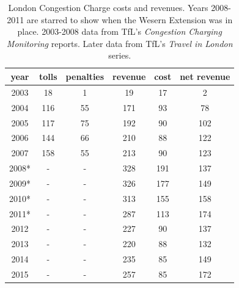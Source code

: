 

\begin{table}[ht]
\begin{tabular}{|c|c|c|c|c|c|}
\hline 
year & tolls & penalties & revenue & cost & net revenue\tabularnewline
\hline 
\hline 
2003 & 18 & 1 & 19 & 17 & 2\tabularnewline
\hline 
2004 & 116 & 55 & 171 & 93 & 78\tabularnewline
\hline 
2005 & 117 & 75 & 192 & 90 & 102\tabularnewline
\hline 
2006 & 144 & 66 & 210 & 88 & 122\tabularnewline
\hline 
2007 & 158 & 55 & 213 & 90 & 123\tabularnewline
\hline 
2008{*} & - & - & 328 & 191 & 137\tabularnewline
\hline 
2009{*} & - & - & 326 & 177 & 149\tabularnewline
\hline 
2010{*} & - & - & 313 & 155 & 158\tabularnewline
\hline 
2011{*} & - & - & 287 & 113 & 174\tabularnewline
\hline 
2012 & - & - & 227 & 90 & 137\tabularnewline
\hline 
2013 & - & - & 220 & 88 & 132\tabularnewline
\hline 
2014 & - & - & 235 & 85 & 149\tabularnewline
\hline 
2015 & - & - & 257 & 85 & 172\tabularnewline
\hline 
\end{tabular}

\caption{London Congestion Charge costs and revenues. Years 2008-2011 are starred to show when the Wesern Extension was in place. 2003-2008 data from TfL's \emph{Congestion Charging Monitoring} reports. Later data from TfL's \emph{Travel in London} series. }\label{tab:London-Congestion-Charge}
\end{table}